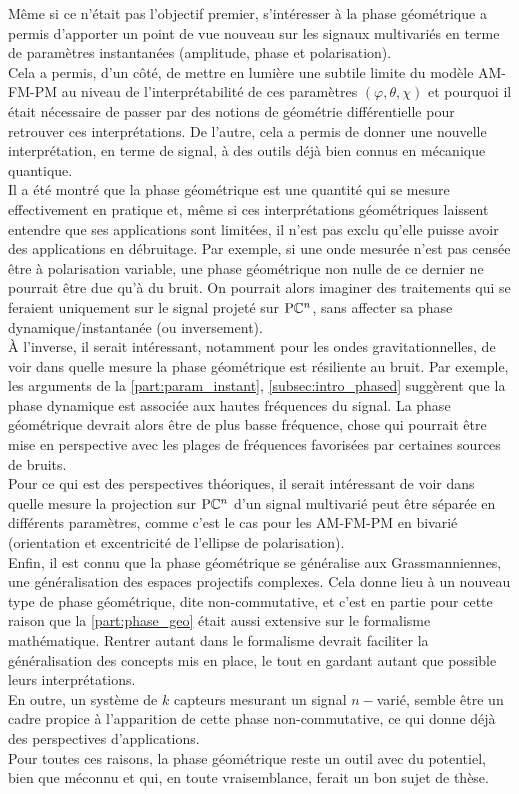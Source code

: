 Même si ce n'était pas l'objectif premier, s’intéresser à la phase géométrique a permis d'apporter un point de vue nouveau sur les signaux multivariés en terme de paramètres instantanées (amplitude, phase et polarisation). 
\\
Cela a permis, d'un côté, de mettre en lumière une subtile limite du modèle AM-FM-PM au niveau de l'interprétabilité de ces paramètres $(\varphi, \theta, \chi)$ et pourquoi il était nécessaire de passer par des notions de géométrie différentielle pour retrouver ces interprétations. 
De l'autre, cela a permis de donner une nouvelle interprétation, en terme de signal, à des outils déjà bien connus en mécanique quantique.
\\

Il a été montré que la phase géométrique est une quantité qui se mesure effectivement en pratique et, même si ces interprétations géométriques laissent entendre que ses applications sont limitées, il n'est pas exclu qu'elle puisse avoir des applications en débruitage. Par exemple, si une onde mesurée n'est pas censée être à polarisation variable, une phase géométrique non nulle de ce dernier ne pourrait être due qu'à du bruit. On pourrait alors imaginer des traitements qui se feraient uniquement sur le signal projeté sur $\text{\normalfont P}\mathbb{C}^{n}$, sans affecter sa phase dynamique/instantanée (ou inversement).
\\
À l'inverse, il serait intéressant, notamment pour les ondes gravitationnelles, de voir dans quelle mesure la phase géométrique est résiliente au bruit. Par exemple, les arguments de la \cref{part:param_instant}, \cref{subsec:intro_phased} suggèrent que la phase dynamique est associée aux hautes fréquences du signal. La phase géométrique devrait alors être de plus basse fréquence, chose qui pourrait être mise en perspective avec les plages de fréquences favorisées par certaines sources de bruits.
\\

Pour ce qui est des perspectives théoriques, il serait intéressant de voir dans quelle mesure la projection sur $\text{\normalfont P}\mathbb{C}^{n}$ d'un signal multivarié peut être séparée en différents paramètres, comme c'est le cas pour les AM-FM-PM en bivarié (orientation et excentricité de l'ellipse de polarisation).
\\
Enfin, il est connu que la phase géométrique se généralise aux Grassmanniennes, une généralisation des espaces projectifs complexes.
Cela donne lieu à un nouveau type de phase géométrique, dite non-commutative, et c'est en partie pour cette raison que la \cref{part:phase_geo} était aussi extensive sur le formalisme mathématique. 
Rentrer autant dans le formalisme devrait faciliter la généralisation des concepts mis en place, le tout en gardant autant que possible leurs interprétations.
\\
En outre, un système de $k$ capteurs mesurant un signal $n-$varié, semble être un cadre propice à l'apparition de cette phase non-commutative, ce qui donne déjà des perspectives d'applications.
\\

Pour toutes ces raisons, la phase géométrique reste un outil avec du potentiel, bien que méconnu et qui, en toute vraisemblance, ferait un bon sujet de thèse.